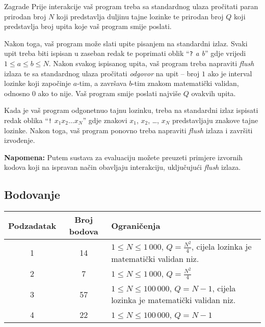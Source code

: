 \begin{statement}[
  problempoints=100,
  timelimit=3 sekunde,
  memorylimit=512 MiB,
]{Zagrade}
Prije interakcije vaš program treba sa standardnog ulaza pročitati paran
prirodan broj $N$ koji predstavlja duljinu tajne lozinke te prirodan broj $Q$
koji predstavlja broj upita koje vaš program smije poslati.

Nakon toga, vaš program može slati upite pisanjem na standardni izlaz. Svaki
upit treba biti ispisan u zaseban redak te poprimati oblik
``\texttt{?} \textit{a b}''
gdje vrijedi $1 \le a \le b \le N$. Nakon svakog ispisanog upita, vaš program
treba napraviti \textit{flush} izlaza te sa standardnog ulaza pročitati
\textit{odgovor} na upit -- broj $1$ ako je interval lozinke koji započinje
$a$-tim, a završava $b$-tim znakom matematički validan, odnosno $0$ ako to
nije. Vaš program smije poslati najviše $Q$ ovakvih upita.

Kada je vaš program odgonetnuo tajnu lozinku, treba na standardni izlaz
ispisati redak oblika ``\texttt{!} \textit{$x_1x_2\dots x_N$}'' gdje znakovi
$x_1$, $x_2$, \dots, $x_N$ predstavljaju znakove tajne lozinke. Nakon toga, vaš
program ponovno treba napraviti \textit{flush} izlaza i završiti izvođenje.

\textbf{Napomena:} Putem sustava za evaluaciju možete preuzeti primjere
izvornih kodova koji na ispravan način obavljaju interakciju, uključujući
\textit{flush} izlaza.

\subsection*{Bodovanje}
{\renewcommand{\arraystretch}{1.4}
  \setlength{\tabcolsep}{6pt}
  \begin{tabular}{ccl}
    Podzadatak & Broj bodova & Ograničenja \\ \midrule
    1 & 14 & $1 \le N \le 1\,000$, $Q = \frac{N^2}{4}$, cijela lozinka je matematički validan niz. \\
    2 & 7 & $1 \le N \le 1\,000$, $Q = \frac{N^2}{4}$ \\
    3 & 57 & $1 \le N \le 100\,000 $, $Q = N - 1$, cijela lozinka je matematički validan niz. \\
    4 & 22 & $1 \le N \le 100\,000 $, $Q = N - 1$ \\
\end{tabular}}


\end{statement}
